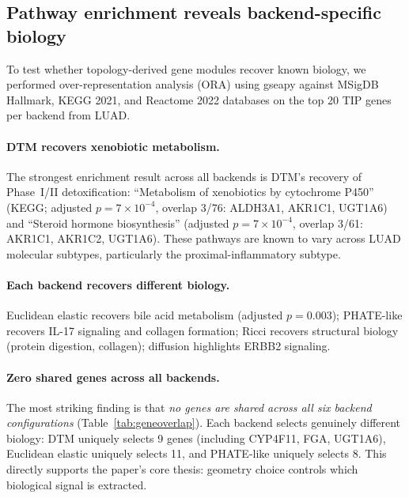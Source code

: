\documentclass[11pt]{article}
\begin{document}
\subsection{Pathway enrichment reveals backend-specific biology}
\label{sec:enrichment}

To test whether topology-derived gene modules recover known biology, we performed over-representation analysis (ORA) using gseapy \cite{gseapy} against MSigDB Hallmark, KEGG 2021, and Reactome 2022 databases on the top 20 TIP genes per backend from LUAD.

\paragraph{DTM recovers xenobiotic metabolism.}
The strongest enrichment result across all backends is DTM's recovery of Phase~I/II detoxification: ``Metabolism of xenobiotics by cytochrome P450'' (KEGG; adjusted $p = 7 \times 10^{-4}$, overlap 3/76: ALDH3A1, AKR1C1, UGT1A6) and ``Steroid hormone biosynthesis'' (adjusted $p = 7 \times 10^{-4}$, overlap 3/61: AKR1C1, AKR1C2, UGT1A6).
These pathways are known to vary across LUAD molecular subtypes, particularly the proximal-inflammatory subtype.

\paragraph{Each backend recovers different biology.}
Euclidean elastic recovers bile acid metabolism (adjusted $p = 0.003$); PHATE-like recovers IL-17 signaling and collagen formation; Ricci recovers structural biology (protein digestion, collagen); diffusion highlights ERBB2 signaling.

\paragraph{Zero shared genes across all backends.}
The most striking finding is that \emph{no genes are shared across all six backend configurations} (Table~\ref{tab:geneoverlap}).
Each backend selects genuinely different biology: DTM uniquely selects 9 genes (including CYP4F11, FGA, UGT1A6), Euclidean elastic uniquely selects 11, and PHATE-like uniquely selects 8.
This directly supports the paper's core thesis: geometry choice controls which biological signal is extracted.
\end{document}
